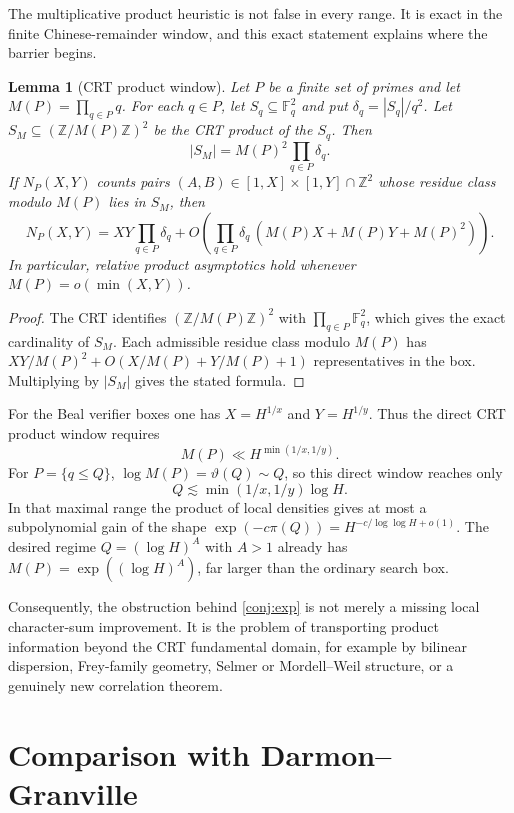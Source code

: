 \documentclass[11pt,a4paper]{article}
\newtheorem{lemma}[theorem]{Lemma}
\begin{document}
The multiplicative product heuristic is not false in every range. It is
exact in the finite Chinese-remainder window, and this exact statement
explains where the barrier begins.

\begin{lemma}[CRT product window]
\label{lem:crt-window}
Let $P$ be a finite set of primes and let $M(P)=\prod_{q\in P}q$.
For each $q\in P$, let $S_q\subseteq\mathbb F_q^2$ and put
$\delta_q=|S_q|/q^2$. Let $S_M\subseteq(\mathbb Z/M(P)\mathbb Z)^2$
be the CRT product of the $S_q$. Then
\[
  |S_M|=M(P)^2\prod_{q\in P}\delta_q.
\]
If $N_P(X,Y)$ counts pairs $(A,B)\in[1,X]\times[1,Y]\cap\mathbb Z^2$
whose residue class modulo $M(P)$ lies in $S_M$, then
\[
  N_P(X,Y)
  = XY\prod_{q\in P}\delta_q
    + O\!\left(\prod_{q\in P}\delta_q\,
      (M(P)X+M(P)Y+M(P)^2)\right).
\]
In particular, relative product asymptotics hold whenever
$M(P)=o(\min(X,Y))$.
\end{lemma}

\begin{proof}
The CRT identifies $(\mathbb Z/M(P)\mathbb Z)^2$ with
$\prod_{q\in P}\mathbb F_q^2$, which gives the exact cardinality of
$S_M$. Each admissible residue class modulo $M(P)$ has
$XY/M(P)^2+O(X/M(P)+Y/M(P)+1)$ representatives in the box. Multiplying
by $|S_M|$ gives the stated formula.
\end{proof}

For the Beal verifier boxes one has $X=H^{1/x}$ and $Y=H^{1/y}$.
Thus the direct CRT product window requires
\[
  M(P)\ll H^{\min(1/x,1/y)}.
\]
For $P=\{q\le Q\}$, $\log M(P)=\vartheta(Q)\sim Q$, so this direct
window reaches only
\[
  Q\lesssim \min(1/x,1/y)\log H.
\]
In that maximal range the product of local densities gives at most a
subpolynomial gain of the shape $\exp(-c\pi(Q))=H^{-c/\log\log H+o(1)}$.
The desired regime $Q=(\log H)^A$ with $A>1$ already has
$M(P)=\exp((\log H)^A)$, far larger than the ordinary search box.

Consequently, the obstruction behind \cref{conj:exp} is not merely a
missing local character-sum improvement. It is the problem of
transporting product information beyond the CRT fundamental domain,
for example by bilinear dispersion, Frey-family geometry, Selmer or
Mordell--Weil structure, or a genuinely new correlation theorem.

\section{Comparison with Darmon--Granville}
\end{document}
